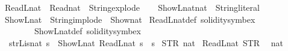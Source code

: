 \begin{isabellebody}
\ {\isacartoucheopen}ReadL\isactrlsub n\isactrlsub a\isactrlsub t\ {\isacharequal}{\kern0pt}\ Read\isactrlsub n\isactrlsub a\isactrlsub t\ {\isasymcirc}\ String{\isachardot}{\kern0pt}explode{\isacartoucheclose}\isanewline
\isanewline
{}\isamarkupfalse%
\ \isanewline
\ \ ShowL\isactrlsub n\isactrlsub a\isactrlsub t{\isacharcolon}{\kern0pt}{\isacharcolon}{\kern0pt}{\isacartoucheopen}nat\ {\isasymRightarrow}\ String{\isachardot}{\kern0pt}literal{\isacartoucheclose}\ {\isacharparenleft}{\kern0pt}{\isacartoucheopen}{\isasymlfloor}{\isacharunderscore}{\kern0pt}{\isasymrfloor}{\isacartoucheclose}{\isacharparenright}{\kern0pt}\isanewline
\ {\isacartoucheopen}ShowL\isactrlsub n\isactrlsub a\isactrlsub t\ {\isacharequal}{\kern0pt}\ String{\isachardot}{\kern0pt}implode\ {\isasymcirc}\ Show\isactrlsub n\isactrlsub a\isactrlsub t{\isacartoucheclose}\isanewline
\isanewline
{}\isamarkupfalse%
\ ReadL\isactrlsub n\isactrlsub a\isactrlsub t{\isacharunderscore}{\kern0pt}def\ {\isacharbrackleft}{\kern0pt}solidity{\isacharunderscore}{\kern0pt}symbex{\isacharbrackright}{\kern0pt}\isanewline
\ \ \ \ \ \ \ \ ShowL\isactrlsub n\isactrlsub a\isactrlsub t{\isacharunderscore}{\kern0pt}def\ {\isacharbrackleft}{\kern0pt}solidity{\isacharunderscore}{\kern0pt}symbex{\isacharbrackright}{\kern0pt}\isanewline
\isanewline
\isanewline
{}\isamarkupfalse%
\ \isanewline
\ \ {\isacartoucheopen}strL{\isacharunderscore}{\kern0pt}is{\isacharunderscore}{\kern0pt}nat{\isacharprime}{\kern0pt}\ s\ {\isacharequal}{\kern0pt}\ {\isacharparenleft}{\kern0pt}ShowL\isactrlsub n\isactrlsub a\isactrlsub t\ {\isacharparenleft}{\kern0pt}ReadL\isactrlsub n\isactrlsub a\isactrlsub t\ s{\isacharparenright}{\kern0pt}\ {\isacharequal}{\kern0pt}\ s{\isacharparenright}{\kern0pt}{\isacartoucheclose}\isanewline
\isanewline
{}\isamarkupfalse%
\ {\isacartoucheopen}{\isasymlceil}STR\ {\isacharprime}{\kern0pt}{\isacharprime}{\kern0pt}{}{}{\isacharprime}{\kern0pt}{\isacharprime}{\kern0pt}{\isasymrceil}{\isacharcolon}{\kern0pt}{\isacharcolon}{\kern0pt}nat{\isacartoucheclose}\isanewline
{}\isamarkupfalse%
\ {\isacartoucheopen}ReadL\isactrlsub n\isactrlsub a\isactrlsub t\ {\isacharparenleft}{\kern0pt}STR\ {\isacharprime}{\kern0pt}{\isacharprime}{\kern0pt}{}{}{\isacharprime}{\kern0pt}{\isacharprime}{\kern0pt}{\isacharparenright}{\kern0pt}{\isacartoucheclose}\isanewline
{}\isamarkupfalse%
\ {\isacartoucheopen}{\isasymlfloor}{}{}{\isacharcolon}{\kern0pt}{\isacharcolon}{\kern0pt}nat{\isasymrfloor}{\isacartoucheclose}\isanewline

\end{isabellebody}
